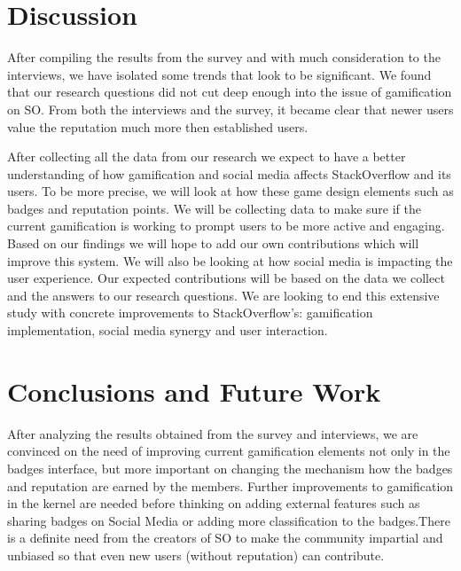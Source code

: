 \documentclass{sigchi}
\begin{document}
\section{Discussion}

After compiling the results from the survey and with much consideration to the interviews, we have isolated some trends that look to be significant. We found that our research questions did not cut deep enough into the issue of gamification on SO. From both the interviews and the survey, it became clear that newer users value the reputation much more then established users. 



After collecting all the data from our research we expect to have a better understanding of how gamification and social media affects StackOverflow and its users. To be more precise, we will look at how these game design elements such as badges and reputation points. We will be collecting data to make sure if the current gamification is working to prompt users to be more active and engaging. Based on our findings we will hope to add our own contributions which will improve this system. We will also be looking at how social media is impacting the user experience. Our expected contributions will be based on the data we collect and the answers to our research questions. We are looking to end this extensive study with concrete improvements to StackOverflow’s: gamification implementation, social media synergy and user interaction.



\section{Conclusions and Future Work}

After analyzing the results obtained from the survey and interviews, we are convinced on the need of improving current gamification elements not only in the badges interface, but more important on changing the mechanism how the badges and reputation are earned by the members. Further improvements to gamification in the kernel are needed before thinking on adding external features such as sharing badges on Social Media or adding more classification to the badges.There is a definite need from the creators of SO to make the community impartial and unbiased so that even new users (without reputation) can contribute.  


% 
% 
\end{document}
